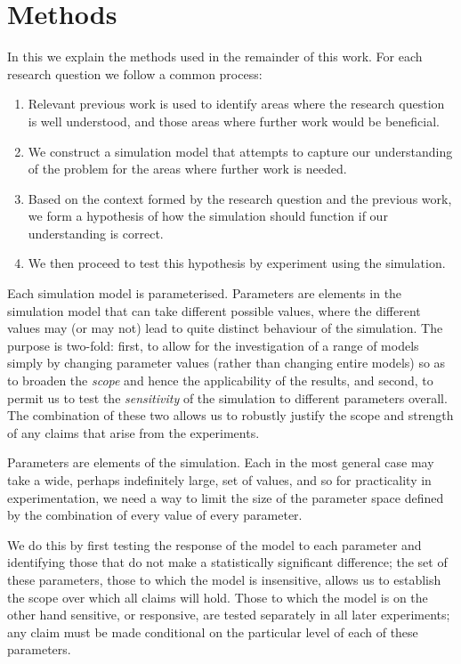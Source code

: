 \section{Methods}\label{methods}

In this  we explain the methods used in the remainder of this work. For each research question we follow a common process:
\begin{enumerate}
	\item Relevant previous work is used to identify areas where the research question is well understood, and those areas where further work would be beneficial.
	\item We construct a simulation model that attempts to capture our understanding of the problem for the areas where further work is needed.
	\item Based on the context formed by the research question and the previous work, we form a hypothesis of how the simulation should function if our understanding is correct.
	\item We then proceed to test this hypothesis by experiment using the simulation.
\end{enumerate}

Each simulation model is parameterised. Parameters are elements in the simulation model that can take different possible values, where the different values may (or may not) lead to quite distinct behaviour of the simulation. The purpose is two-fold: first, to allow for the investigation of a range of models simply by changing parameter values (rather than changing entire models) so as to broaden the \emph{scope} and hence the applicability of the results, and second, to permit us to test the \emph{sensitivity} of the simulation to different parameters overall. The combination of these two allows us to robustly justify the scope and strength of any claims that arise from the experiments.

Parameters are elements of the simulation. Each in the most general case may take a wide, perhaps indefinitely large, set of values, and so for practicality in experimentation, we need a way to limit the size of the parameter space defined by the combination of every value of every parameter. 

We do this by first testing the response of the model to each parameter and identifying those that do not make a statistically significant difference; the set of these parameters, those to which the model is insensitive, allows us to establish the scope over which all claims will hold. Those to which the model is on the other hand sensitive, or responsive, are tested separately in all later experiments; any claim must be made conditional on the particular level of each of these parameters.

